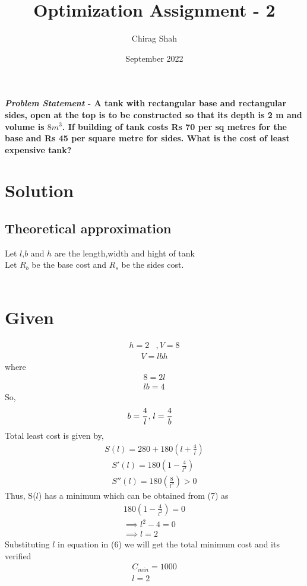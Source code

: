 \documentclass[journal,10pt,twocolumn]{article}
\title{\textbf{Optimization Assignment - 2}}
\author{Chirag Shah}
\date{September 2022}
\providecommand{\brak}[1]{\ensuremath{\left(#1\right)}}
\begin{document}
\maketitle
\paragraph{\textit{Problem Statement} - A tank with rectangular base and rectangular sides, open at the top is to be constructed so that its depth is 2 m and volume is $8 m^3$. If building of tank costs Rs 70 per sq metres for the base and Rs 45 per square metre for sides. What is the cost of least expensive tank?}

\section*{\large Solution}
\subsection*{\normalsize Theoretical approximation}
Let $l$,$b$ and $h$ are the length,width and hight of tank \\
Let $R_b$ be the base cost and $R_s$ be the sides cost.\\\ \vspace{2mm}

\section*{\large Given}
\begin{align}
h=2 &, V=8
\end{align}
\begin{align}
	V = lbh
\end{align}
where
\begin{align}
	8=2l\\
	lb=4
\end{align}
So,
\begin{align}
	b=\frac{4}{l},\hspace{1mm} & l=\frac{4}{b}
\end{align}
Total least cost is given by,\\ \vspace{1mm}
\begin{align}
    S(l)=280+180\brak{l+\frac{4}{l}}
\end{align}
\begin{align}
	S'(l)=180\brak{1-\frac{4}{l^2}}\\
        S''(l)= 180\brak{\frac{8}{l^3}} > 0
\end{align}
Thus, S($l$) has a minimum which can be obtained from (7) as 
\begin{align}
    180\brak{1-\frac{4}{l^2}}=0\\
    \implies l^2-4=0\\
    \implies l=2
\end{align}
Substituting $l$ in equation in (6) we will get the total minimum cost and its verified 
\begin{align}
	\boxed{C_{min} = 1000}\\
	\boxed{l = 2}
\end{align}
\end{document}
